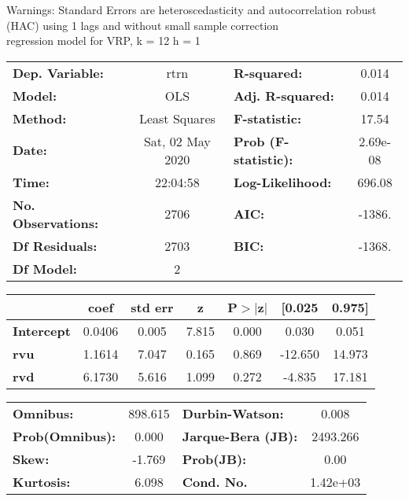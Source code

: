 Warnings: \newline
 [1] Standard Errors are heteroscedasticity and autocorrelation robust (HAC) using 1 lags and without small sample correction\\ 

regression model for VRP, k = 12 h = 1\begin{center}
\begin{tabular}{lclc}
\toprule
\textbf{Dep. Variable:}    &       rtrn       & \textbf{  R-squared:         } &     0.014   \\
\textbf{Model:}            &       OLS        & \textbf{  Adj. R-squared:    } &     0.014   \\
\textbf{Method:}           &  Least Squares   & \textbf{  F-statistic:       } &     17.54   \\
\textbf{Date:}             & Sat, 02 May 2020 & \textbf{  Prob (F-statistic):} &  2.69e-08   \\
\textbf{Time:}             &     22:04:58     & \textbf{  Log-Likelihood:    } &    696.08   \\
\textbf{No. Observations:} &        2706      & \textbf{  AIC:               } &    -1386.   \\
\textbf{Df Residuals:}     &        2703      & \textbf{  BIC:               } &    -1368.   \\
\textbf{Df Model:}         &           2      & \textbf{                     } &             \\
\bottomrule
\end{tabular}
\begin{tabular}{lcccccc}
                   & \textbf{coef} & \textbf{std err} & \textbf{z} & \textbf{P$> |$z$|$} & \textbf{[0.025} & \textbf{0.975]}  \\
\midrule
\textbf{Intercept} &       0.0406  &        0.005     &     7.815  &         0.000        &        0.030    &        0.051     \\
\textbf{rvu}       &       1.1614  &        7.047     &     0.165  &         0.869        &      -12.650    &       14.973     \\
\textbf{rvd}       &       6.1730  &        5.616     &     1.099  &         0.272        &       -4.835    &       17.181     \\
\bottomrule
\end{tabular}
\begin{tabular}{lclc}
\textbf{Omnibus:}       & 898.615 & \textbf{  Durbin-Watson:     } &    0.008  \\
\textbf{Prob(Omnibus):} &   0.000 & \textbf{  Jarque-Bera (JB):  } & 2493.266  \\
\textbf{Skew:}          &  -1.769 & \textbf{  Prob(JB):          } &     0.00  \\
\textbf{Kurtosis:}      &   6.098 & \textbf{  Cond. No.          } & 1.42e+03  \\
\bottomrule
\end{tabular}
\end{center}

